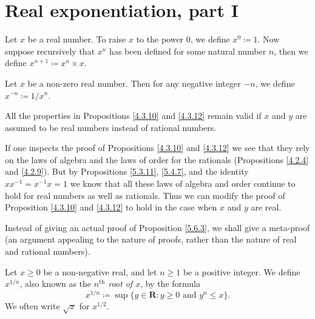 \section{Real exponentiation, part I}\label{sec 5.6}

\begin{definition}\label{5.6.1}
    Let \(x\) be a real number.
    To raise \(x\) to the power \(0\), we define \(x^0 \coloneqq 1\).
    Now suppose recursively that \(x^n\) has been defined for some natural number \(n\), then we define \(x^{n + 1} \coloneqq x^n \times x\).
\end{definition}

\begin{definition}\label{5.6.2}
    Let \(x\) be a non-zero real number.
    Then for any negative integer \(-n\), we define \(x^{-n} \coloneqq 1 / x^n\).
\end{definition}

\begin{proposition}\label{5.6.3}
    All the properties in Propositions \ref{4.3.10} and \ref{4.3.12} remain valid if \(x\) and \(y\) are assumed to be real numbers instead of rational numbers.
\end{proposition}

\begin{meta-proof}
If one inspects the proof of Propositions \ref{4.3.10} and \ref{4.3.12} we see that they rely on the laws of algebra and the laws of order for the rationals (Propositions \ref{4.2.4} and \ref{4.2.9}).
But by Propositions \ref{5.3.11}, \ref{5.4.7}, and the identity \(xx^{-1} = x^{-1} x = 1\) we know that all these laws of algebra and order continue to hold for real numbers as well as rationals.
Thus we can modify the proof of Proposition \ref{4.3.10} and \ref{4.3.12} to hold in the case when \(x\) and \(y\) are real.
\end{meta-proof}

\begin{note}
    Instead of giving an actual proof of Proposition \ref{5.6.3}, we shall give a meta-proof
    (an argument appealing to the nature of proofs, rather than the nature of real and rational numbers).
\end{note}

\begin{definition}\label{5.6.4}
    Let \(x \geq 0\) be a non-negative real, and let \(n \geq 1\) be a positive integer.
    We define \(x^{1 / n}\), also known as the \emph{\(n^{\text{th}}\) root of \(x\)}, by the formula
    \[
        x^{1 / n} \coloneqq \sup\{y \in \mathbf{R} : y \geq 0 \text{ and } y^n \leq x\}.
    \]
    We often write \(\sqrt{x}\) for \(x^{1 / 2}\).
\end{definition}

